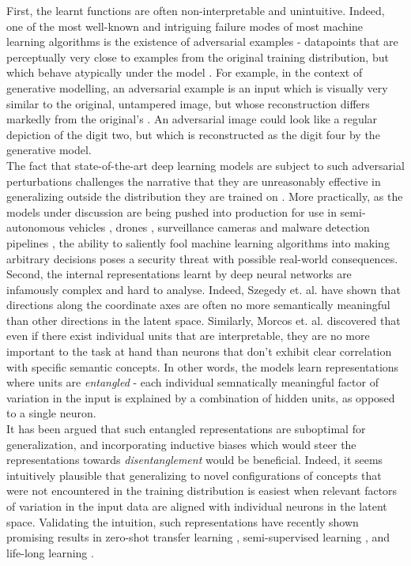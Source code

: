 \documentclass{report}
\begin{document}
\noindent First, the learnt functions are often non-interpretable and unintuitive. Indeed, one of the most well-known and intriguing failure modes of most machine learning algorithms is the existence of adversarial examples - datapoints that are perceptually very close to examples from the original training distribution, but which behave atypically under the model \cite{intriguing-properties}. For example, in the context of generative modelling, an adversarial example is an input which is visually very similar to the original, untampered image, but whose reconstruction differs markedly from the original's \cite{kos-gen-adv, tabacof-gen-adv}. An adversarial image could look like a regular depiction of the digit two, but which is reconstructed as the digit four by the generative model. \\

\noindent The fact that state-of-the-art deep learning models are subject to such adversarial perturbations challenges the narrative that they are unreasonably effective in generalizing outside the distribution they are trained on \cite{bengio-deep-architectures}. More practically, as the models under discussion are being pushed into production for use in semi-autonomous vehicles \cite{nvidia-self-driving-cars}, drones \cite{drones}, surveillance cameras \cite{surveillance-cameras} and malware detection pipelines \cite{malware}, the ability to saliently fool machine learning algorithms into making arbitrary decisions poses a security threat with possible real-world consequences. \\

\noindent Second, the internal representations learnt by deep neural networks are infamously complex and hard to analyse. Indeed, Szegedy et. al. \cite{intriguing-properties} have shown that directions along the coordinate axes are often no more semantically meaningful than other directions in the latent space. Similarly, Morcos et. al. \cite{importance-single-directions} discovered that even if there exist individual units that are interpretable, they are no more important to the task at hand than neurons that don't exhibit clear correlation with specific semantic concepts. In other words, the models learn representations where units are \textit{entangled} - each individual semnatically meaningful factor of variation in the input is explained by a combination of hidden units, as opposed to a single neuron. \\

\noindent It has been argued \cite{bengio-representation} that such entangled representations are suboptimal for generalization, and incorporating inductive biases which would steer the representations towards \textit{disentanglement} would be beneficial. Indeed, it seems intuitively plausible that generalizing to novel configurations of concepts that were not encountered in the training distribution is easiest when relevant factors of variation in the input data are aligned with individual neurons in the latent space. Validating the intuition, such representations have recently shown promising results in zero-shot transfer learning \cite{darla}, semi-supervised learning \cite{dgpose}, and life-long learning \cite{vase}. \\
\end{document}

